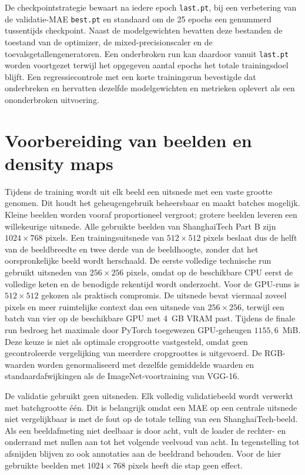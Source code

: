De checkpointstrategie bewaart na iedere epoch \texttt{last.pt}, bij een verbetering van de validatie-MAE \texttt{best.pt} en standaard om de 25 epochs een genummerd tussentijds checkpoint. Naast de modelgewichten bevatten deze bestanden de toestand van de optimizer, de mixed-precisionscaler en de toevalsgetallengeneratoren. Een onderbroken run kan daardoor vanuit \texttt{last.pt} worden voortgezet terwijl het opgegeven aantal epochs het totale trainingsdoel blijft. Een regressiecontrole met een korte trainingsrun bevestigde dat onderbreken en hervatten dezelfde modelgewichten en metrieken oplevert als een ononderbroken uitvoering.

\section{Voorbereiding van beelden en density maps}

Tijdens de training wordt uit elk beeld een uitsnede met een vaste grootte genomen. Dit houdt het geheugengebruik beheersbaar en maakt batches mogelijk. Kleine beelden worden vooraf proportioneel vergroot; grotere beelden leveren een willekeurige uitsnede. Alle gebruikte beelden van ShanghaiTech Part B zijn \(1024 \times 768\) pixels. Een trainingsuitsnede van \(512 \times 512\) pixels beslaat dus de helft van de beeldbreedte en twee derde van de beeldhoogte, zonder dat het oorspronkelijke beeld wordt herschaald. De eerste volledige technische run gebruikt uitsneden van \(256 \times 256\) pixels, omdat op de beschikbare CPU eerst de volledige keten en de benodigde rekentijd wordt onderzocht. Voor de GPU-runs is \(512 \times 512\) gekozen als praktisch compromis. De uitsnede bevat viermaal zoveel pixels en meer ruimtelijke context dan een uitsnede van \(256 \times 256\), terwijl een batch van vier op de beschikbare GPU met 4~GB VRAM past. Tijdens de finale run bedroeg het maximale door PyTorch toegewezen GPU-geheugen \(1155{,}6\)~MiB. Deze keuze is niet als optimale cropgrootte vastgesteld, omdat geen gecontroleerde vergelijking van meerdere cropgroottes is uitgevoerd. De RGB-waarden worden genormaliseerd met dezelfde gemiddelde waarden en standaardafwijkingen als de ImageNet-voortraining van VGG-16.

De validatie gebruikt geen uitsneden. Elk volledig validatiebeeld wordt verwerkt met batchgrootte één. Dit is belangrijk omdat een MAE op een centrale uitsnede niet vergelijkbaar is met de fout op de totale telling van een ShanghaiTech-beeld. Als een beeldafmeting niet deelbaar is door acht, vult de loader de rechter- en onderrand met nullen aan tot het volgende veelvoud van acht. In tegenstelling tot afsnijden blijven zo ook annotaties aan de beeldrand behouden. Voor de hier gebruikte beelden met \(1024 \times 768\) pixels heeft die stap geen effect.

